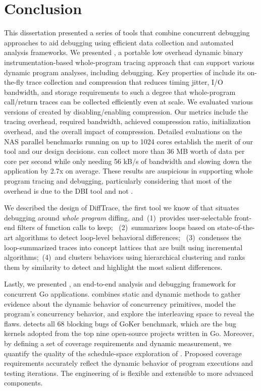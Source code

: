 
\chapter{Conclusion}
\label{sec:ch5}
This dissertation presented a series of tools that combine concurrent debugging approaches to aid debugging using efficient data collection and automated analysis frameworks.
%
We presented \parlot, a portable low overhead dynamic binary instrumentation-based whole-program tracing approach that can support various dynamic program analyses, including debugging.
%
Key properties of \parlot include its on-the-fly trace collection and compression that reduces timing jitter, I/O bandwidth, and storage requirements to such a degree that whole-program call/return traces can be collected efficiently even at scale.
%
We evaluated various versions of \parlot created by disabling/enabling compression.
%
Our metrics include the tracing overhead, required bandwidth, achieved compression ratio, initialization overhead, and the overall impact of compression.
%
Detailed evaluations on the NAS parallel benchmarks running on up to 1024 cores establish the merit of our tool and our design decisions. \parlot can collect more than 36 MB worth of data per core per second while only needing 56 kB/s of bandwidth and slowing down the application by 2.7x on average.
%
These results are auspicious in supporting whole program tracing and debugging, particularly considering that most of the overhead is due to the DBI tool and not \parlot.


We described the design of DiffTrace, the first tool we know of that situates debugging around {\em whole program} diffing, and~(1)~provides user-selectable front-end filters of function calls to keep;
~(2)~summarizes loops based on state-of-the-art algorithms to detect loop-level behavioral differences;
~(3)~condenses the loop-summarized traces into concept lattices that are built using incremental algorithms;~(4)~and clusters behaviors using hierarchical clustering and ranks them by similarity to detect and highlight the most salient differences.

Lastly, we presented \goat, an end-to-end analysis and debugging framework for concurrent Go applications.
%
\goat combines static and dynamic methods to gather evidence about the dynamic behavior of concurrency primitives, model the program's concurrency behavior, and explore the interleaving space to reveal the flaws.
%
\goat detects all 68 blocking bugs of GoKer benchmark, which are the bug kernels adopted from the top nine open-source projects written in Go.
%
Moreover, by defining a set of coverage requirements and dynamic measurement, we quantify the quality of the schedule-space exploration of \goat.
%
Proposed coverage requirements accurately reflect the dynamic behavior of program executions and testing iterations.
%
The engineering of \goat is flexible and extensible to more advanced components.

